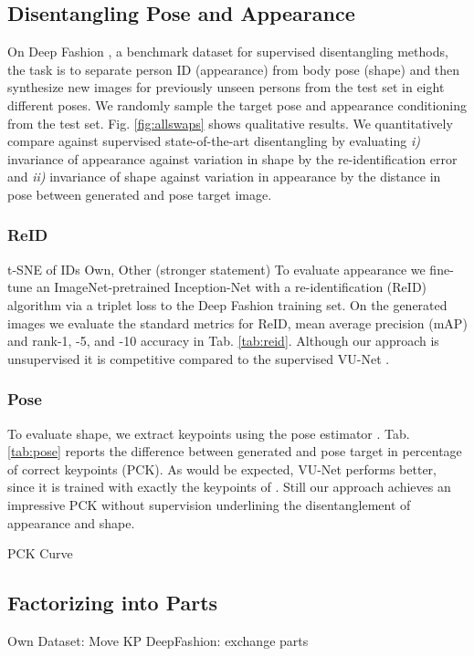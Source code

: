 	\subsection{Disentangling Pose and Appearance}
	On Deep Fashion \cite{liu16deepfashion, liu16deepfashionwild}, a benchmark dataset for supervised disentangling methods, the task is to separate person ID (appearance) from body pose (shape) and then synthesize new images for previously unseen persons from the test set in eight different poses. We randomly sample the target pose and appearance conditioning from the test set. Fig. \ref{fig:allswaps} shows qualitative results.
	We quantitatively compare against supervised state-of-the-art disentangling \cite{esser18} by evaluating \emph{i)} invariance of appearance against variation in shape by the re-identification error and \emph{ii)} invariance of shape against variation in appearance by the distance in pose between generated and pose target image.

	\subsubsection{ReID}
	t-SNE of IDs
	Own, Other (stronger statement)
	To evaluate appearance we fine-tune an ImageNet-pretrained \cite{russakovsky15imagenet} Inception-Net \cite{szegedy15inception} with a re-identification (ReID) algorithm \cite{xiao17reidjoint} via a triplet loss \cite{hermans17reidtriplet} to the Deep Fashion training set.
	On the generated images we evaluate the standard metrics for ReID, mean average precision (mAP) and rank-1, -5, and -10 accuracy in Tab. \ref{tab:reid}.
	Although our approach is unsupervised it is competitive compared to the supervised VU-Net \cite{esser18}.



	\subsubsection{Pose}
	To evaluate shape, we extract keypoints using the pose estimator \cite{cao17affinityfield}. Tab. \ref{tab:pose} reports the difference between generated and pose target in percentage of correct keypoints (PCK). As would be expected, VU-Net performs better, since it is trained with exactly the keypoints of \cite{cao17affinityfield}. Still our approach achieves an impressive PCK without supervision underlining the disentanglement of appearance and shape.


	PCK Curve
	\subsection{Factorizing into Parts}
		Own Dataset: Move KP
		DeepFashion: exchange parts
